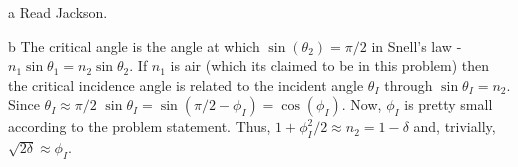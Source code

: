 \begin{homeworkProblem}
\begin{homeworkSection}{a}
Read Jackson.
\end{homeworkSection}
\begin{homeworkSection}{b}
The critical angle is the angle at which $\sin(\theta_2)= \pi/2$ in Snell's law - $n_1 \sin\theta_1 = n_2\sin\theta_2$. If $n_1$ is air (which its claimed to be in this problem) then the critical incidence angle is related to the incident angle $\theta_I$ through $\sin\theta_I = n_2$. Since $\theta_I \approx \pi/2$ $\sin\theta_I = \sin(\pi/2-\phi_I) = \cos(\phi_I)$. Now, $\phi_I$ is pretty small according to the problem statement. Thus, $1+\phi_I^2/2 \approx n_2 = 1-\delta$ and, trivially, $\sqrt{2\delta}\approx \phi_I$.
\end{homeworkSection}
\end{homeworkProblem}
